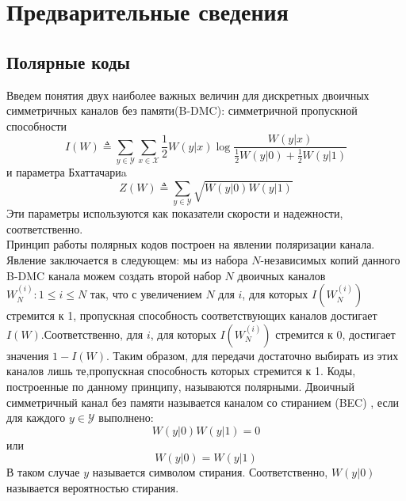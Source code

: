 \documentclass{llncs}
\begin{document}

\section{Предварительные сведения}
\subsection{Полярные коды}
Введем понятия двух наиболее важных величин для дискретных двоичных симметричных каналов без памяти(B-DMC):  симметричной пропускной способности
\begin{equation}
    I(W) \triangleq \sum\limits_{y\in\mathcal{Y}} \sum\limits_{x\in\mathcal{X}}\frac{1}{2}W(y|x)\log\frac{W(y|x)}{\frac{1}{2}W(y|0)+\frac{1}{2}W(y|1)}
\end{equation}
и параметра Бхаттачариa
\begin{equation}
    Z(W) \triangleq \sum\limits_{y\in\mathcal{Y}} \sqrt{W(y|0)W(y|1)}
\end{equation} Эти параметры используются как показатели скорости и надежности, соответственно.
\\
Принцип работы полярных кодов построен на явлении поляризации канала. Явление заключается в следующем: мы из набора $N$-независимых копий данного B-DMC канала можем создать второй набор $N$ двоичных каналов $W_N^{(i)}: 1\leq i\leq N$ так, что с увеличением $N$ для $i$, для которых $I(W_N^{(i)})$ стремится к 1, пропускная способность соответствующих каналов достигает $I(W)$.Соответственно, для $i$, для которых $I(W_N^{(i)})$ стремится к 0, достигает значения $1-I(W)$. Таким образом, для передачи достаточно выбирать из этих каналов лишь те,пропускная способность которых стремится к 1. Коды, построенные по данному принципу, называются полярными. 
Двоичный симметричный канал без памяти называется каналом со стиранием (BEC) , если для каждого $y\in\mathcal{Y}$ выполнено:
\begin{equation}
    W(y|0)W(y|1)=0 
\end{equation}
или 
\begin{equation}
    W(y|0)=W(y|1)
\end{equation}
В таком случае $y$ называется символом стирания. Соответственно, $W(y|0)$ называется вероятностью стирания.
\\
\end{document}
